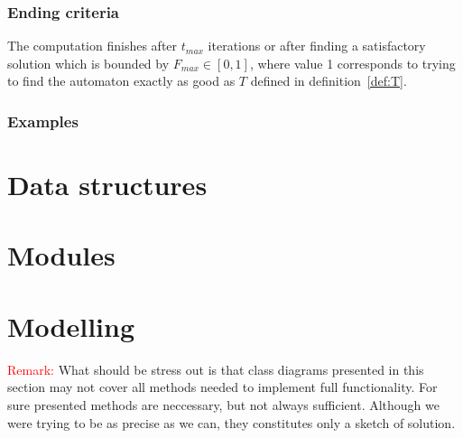 \documentclass{article}
\begin{document}
\subsubsection{Ending criteria}
The computation finishes after $t_{max}$ iterations or after finding a satisfactory solution which is bounded by $F_{max} \in [0,1]$, where value 1 corresponds to trying to find the automaton exactly as good as $T$ defined in definition~\ref{def:T}.



\subsubsection{Examples}




\section{Data structures}




\section{Modules}
	



\section{Modelling}

\textcolor{red}{Remark:} What should be stress out is that class diagrams presented in this section may not cover all methods needed to implement full functionality. For sure presented methods are neccessary, but not always sufficient. Although we were trying to be as precise as we can, they constitutes only a sketch of solution.




\end{document}
